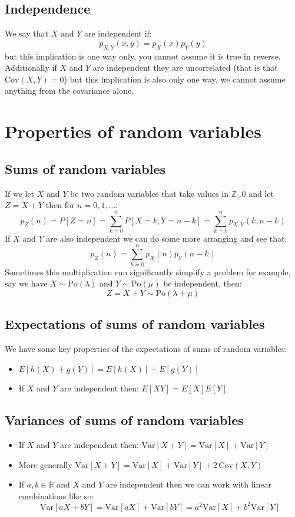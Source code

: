 \documentclass[12pt]{article}
\newcommand{\Var}[1]{\text{Var}[#1]}
\begin{document}
\subsection*{Independence}
We say that \(X\) and \(Y\) are independent if:
\[p_{X,Y}(x,y)=p_X(x)p_Y(y)\]
but this implication is one way only, you cannot assume it is true in reverse. Additionally if \(X\) and \(Y\) are independent they are uncorrelated (that is that \(\text{Cov}(X,Y)=0\)) but this implication is also only one way, we cannot assume anything from the covariance alone.
\section{Properties of random variables}
\subsection*{Sums of random variables}
If we let \(X\) and \(Y\) be two random variables that take values in \(\mathbb{Z}_\geq0\) and let \(Z=X+Y\) then for \(n=0,1,...\):
\[p_Z(n)=P[Z=n]=\sum^n_{k=0}P[X=k, Y=n-k]=\sum^n_{k=0}p_{X,Y}(k,n-k)\]
If \(X\) and \(Y\) are also independent we can do some more arranging and see that:
\[p_Z(n)=\sum^n_{k=0}p_X(n)p_Y(n-k)\]
Sometimes this multiplication can significantly simplify a problem for example, say we have \(X\sim\text{Po}(\lambda)\) and \(Y\sim\text{Po}(\mu)\) be independent, then:
\[Z=X+Y\sim \text{Po}(\lambda+\mu)\]
\subsection*{Expectations of sums of random variables}
We have some key properties of the expectations of sums of random variables:
\begin{itemize}
    \item \(E[h(X)+g(Y)]=E[h(X)]+E[g(Y)]\)
    \item If \(X\) and \(Y\) are independent then: \(E[XY]=E[X]E[Y]\)
\end{itemize}
\subsection*{Variances of sums of random variables}
\begin{itemize}
    \item If \(X\) and \(Y\) are independent then: \(\Var{X+Y}=\Var{X}+\Var{Y}\)
    \item More generally \(\Var{X+Y}=\Var{X}+\Var{Y}+2\,\text{Cov}(X,Y)\)
    \item If \(a,b\in\mathbb{R}\) and \(X\) and \(Y\) are independent then we can work with linear combinations like so:
    \[\Var{aX+bY}=\Var{aX}+\Var{bY}=a^2\Var{X}+b^2\Var{Y}\]
\end{itemize}
\end{document}
